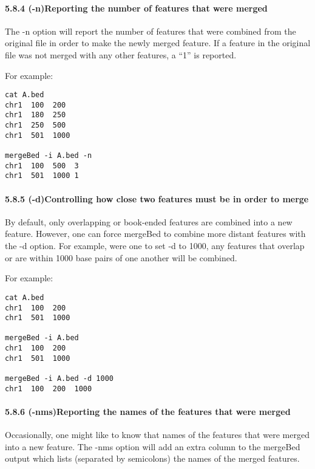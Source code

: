 \documentclass[letterpaper,10pt,english]{sphinxmanual}
\begin{document}
\paragraph{5.8.4 (-n)Reporting the number of features that were merged}
\label{content/mergeBed:n-reporting-the-number-of-features-that-were-merged}
The -n option will report the number of features that were combined from the original file in order to
make the newly merged feature. If a feature in the original file was not merged with any other features,
a ``1'' is reported.

For example:

\begin{Verbatim}[commandchars=\\\{\}]
cat A.bed
chr1  100  200
chr1  180  250
chr1  250  500
chr1  501  1000

mergeBed -i A.bed -n
chr1  100  500  3
chr1  501  1000 1
\end{Verbatim}


\paragraph{5.8.5 (-d)Controlling how close two features must be in order to merge}
\label{content/mergeBed:d-controlling-how-close-two-features-must-be-in-order-to-merge}
By default, only overlapping or book-ended features are combined into a new feature. However, one can
force mergeBed to combine more distant features with the -d option. For example, were one to set -d to
1000, any features that overlap or are within 1000 base pairs of one another will be combined.

For example:

\begin{Verbatim}[commandchars=\\\{\}]
cat A.bed
chr1  100  200
chr1  501  1000

mergeBed -i A.bed
chr1  100  200
chr1  501  1000

mergeBed -i A.bed -d 1000
chr1  100  200  1000
\end{Verbatim}


\paragraph{5.8.6 (-nms)Reporting the names of the features that were merged}
\label{content/mergeBed:nms-reporting-the-names-of-the-features-that-were-merged}
Occasionally, one might like to know that names of the features that were merged into a new feature.
The -nms option will add an extra column to the mergeBed output which lists (separated by
semicolons) the names of the merged features.
\end{document}
